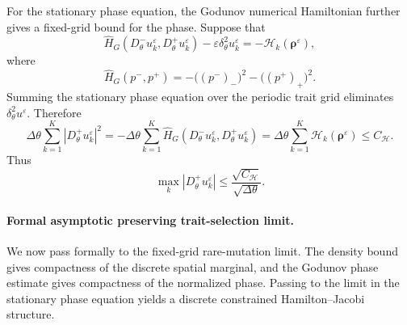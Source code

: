 \documentclass[11pt]{article}
\begin{document}
For the stationary phase equation, the Godunov numerical Hamiltonian further gives a
fixed-grid bound for the phase.  Suppose that
\begin{equation}\label{def:Godunov_eq}
    \widehat H_G
    \left(
        D_\theta^-u_k^\varepsilon,
        D_\theta^+u_k^\varepsilon
    \right)
    -
    \varepsilon\delta_\theta^2u_k^\varepsilon
    =
    -\mathcal H_k(\boldsymbol\rho^\varepsilon),
\end{equation}
where
\begin{equation}\label{def:Godunov}
    \widehat H_G(p^-,p^+)
    =
    -\bigl((p^-)_{-}\bigr)^2
    -
    \bigl((p^+)_{+}\bigr)^2 .
\end{equation}
Summing the stationary phase equation over the periodic trait grid eliminates
\(\delta_\theta^2u^\varepsilon\).  Therefore
\[
    \Delta\theta
    \sum_{k=1}^K |D_\theta^+u_k^\varepsilon|^2
    =
    -\Delta\theta
    \sum_{k=1}^K
    \widehat H_G
    \left(
        D_\theta^-u_k^\varepsilon,
        D_\theta^+u_k^\varepsilon
    \right)
    =
    \Delta\theta
    \sum_{k=1}^K
    \mathcal H_k(\boldsymbol\rho^\varepsilon)
    \le C_{\mathcal H}.
\]
Thus
\begin{equation}\label{proof:bound_Du}
    \max_k |D_\theta^+u_k^\varepsilon|
    \le
    \frac{\sqrt{C_{\mathcal H}}}{\sqrt{\Delta\theta}} .
\end{equation}


\paragraph{Formal asymptotic preserving trait-selection limit.}

We now pass formally to the fixed-grid rare-mutation limit.  The density bound
gives compactness of the discrete spatial marginal, and the Godunov phase
estimate gives compactness of the normalized phase.  Passing to the limit in
the stationary phase equation yields a discrete constrained Hamilton--Jacobi
structure.
\end{document}
